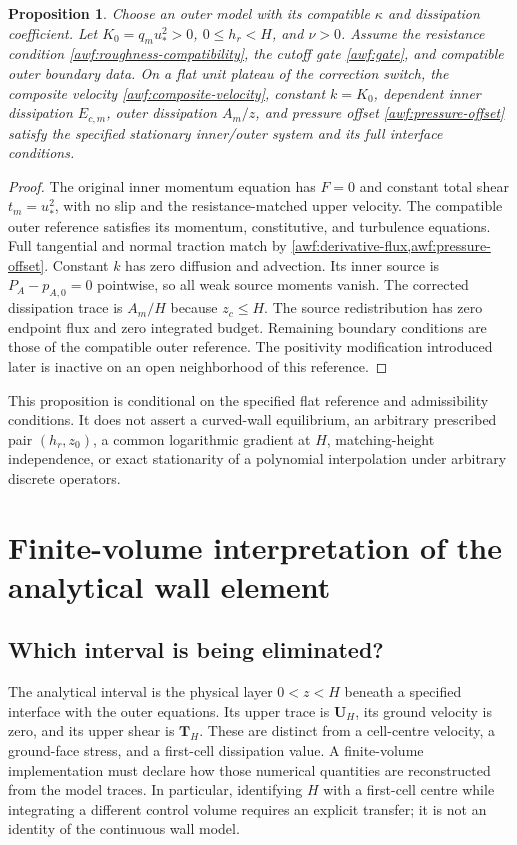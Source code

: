 \documentclass[11pt,a4paper]{article}
\numberwithin{equation}{section}
\newtheorem{proposition}{Proposition}[section]
\newcommand{\ust}{u_*}
\begin{document}
\begin{proposition}
Choose an outer model with its compatible $\kappa$ and dissipation
coefficient. Let $K_0=q_m\ust^2>0$, $0\le h_r<H$, and $\nu>0$.
Assume the resistance condition \eqref{awf:roughness-compatibility},
the cutoff gate \eqref{awf:gate}, and compatible outer boundary data.
On a flat unit plateau of the correction switch, the composite
velocity \eqref{awf:composite-velocity}, constant $k=K_0$, dependent
inner dissipation $E_{c,m}$, outer dissipation $A_m/z$, and pressure
offset \eqref{awf:pressure-offset} satisfy the specified stationary
inner/outer system and its full interface conditions.
\end{proposition}
\begin{proof}
The original inner momentum equation has $F=0$ and constant total
shear $t_m=\ust^2$, with no slip and the resistance-matched upper
velocity. The compatible outer reference satisfies its momentum,
constitutive, and turbulence equations. Full tangential and normal
traction match by \cref{awf:derivative-flux,awf:pressure-offset}.
Constant $k$ has zero diffusion and advection. Its inner source is
$P_A-p_{A,0}=0$ pointwise, so all weak source moments vanish.
The corrected dissipation trace is $A_m/H$ because $z_c\le H$.
The source redistribution has zero endpoint flux and zero integrated
budget. Remaining boundary conditions are those of the compatible
outer reference. The positivity modification introduced later is
inactive on an open neighborhood of this reference.
\end{proof}

This proposition is conditional on the specified flat reference and
admissibility conditions. It does not assert a curved-wall equilibrium,
an arbitrary prescribed pair $(h_r,z_0)$, a common logarithmic gradient
at $H$, matching-height independence, or exact stationarity of a
polynomial interpolation under arbitrary discrete operators.


\section{Finite-volume interpretation of the analytical wall element}
\label{geo:fv}

\subsection{Which interval is being eliminated?}

The analytical interval is the physical layer $0<z<H$ beneath a
specified interface with the outer equations.  Its upper trace is
$\boldsymbol U_H$, its ground velocity is zero, and its upper shear
is $\boldsymbol T_H$.  These are distinct from a cell-centre velocity,
a ground-face stress, and a first-cell dissipation value.  A
finite-volume implementation must declare how those numerical quantities
are reconstructed from the model traces.  In particular, identifying
$H$ with a first-cell centre while integrating a different control
volume requires an explicit transfer; it is not an identity of the
continuous wall model.
\end{document}
